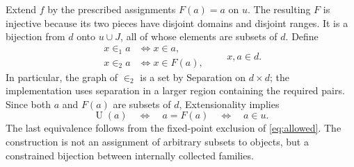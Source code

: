 \documentclass[11pt,a4paper]{article}
\numberwithin{equation}{section}
\theoremstyle{definition}
\theoremstyle{remark}
\newcommand{\Unif}{\operatorname{U}}
\newcommand{\extone}{\in_1}
\newcommand{\exttwo}{\in_2}
\begin{document}
Extend $f$ by the prescribed assignments $F(a)=a$ on $u$. The resulting $F$ is injective because its two pieces have disjoint domains and disjoint ranges. It is a bijection from $d$ onto $u\cup J$, all of whose elements are subsets of $d$. Define
\begin{equation}\label{eq:relations}
\begin{aligned}
x\extone a&\iff x\in a,\\
x\exttwo a&\iff x\in F(a),
\end{aligned}
\qquad x,a\in d.
\end{equation}
In particular, the graph of $\exttwo$ is a set by Separation on $d\times d$; the implementation uses separation in a larger region containing the required pairs. Since both $a$ and $F(a)$ are subsets of $d$, Extensionality implies
\begin{equation}\label{eq:fixed}
\Unif(a)\quad\Longleftrightarrow\quad a=F(a)\quad\Longleftrightarrow\quad a\in u.
\end{equation}
The last equivalence follows from the fixed-point exclusion of \eqref{eq:allowed}. The construction is not an assignment of arbitrary subsets to objects, but a constrained bijection between internally collected families.
\end{document}
